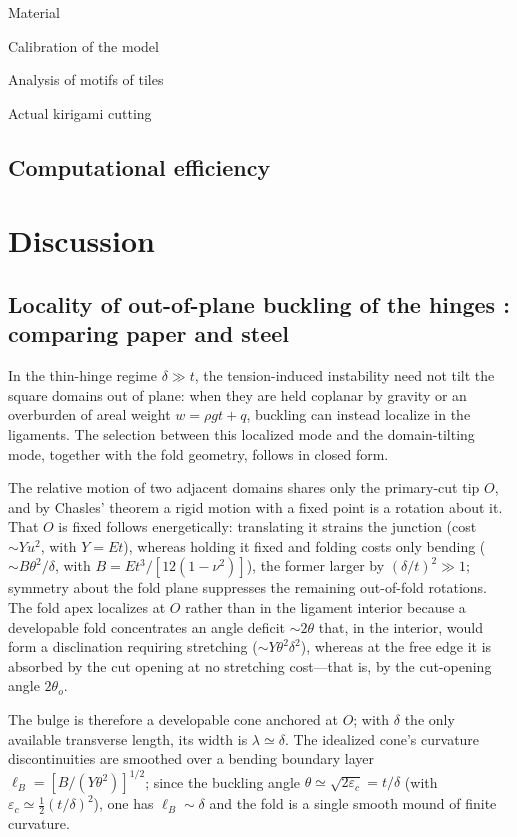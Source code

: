 \documentclass[pdflatex,sn-mathphys-num]{sn-jnl}%
\theoremstyle{thmstyleone}%
\theoremstyle{thmstyletwo}%
\theoremstyle{thmstylethree}%
\begin{document}
Material

Calibration of the model

Analysis of motifs of tiles

Actual kirigami cutting


\subsection{Computational efficiency}


\section{Discussion}\label{secD}

\subsection{Locality of out-of-plane buckling of the hinges : comparing paper and steel}

In the thin-hinge regime $\delta\gg t$, the tension-induced instability need not
tilt the square domains out of plane: when they are held coplanar by gravity or an
overburden of areal weight $w=\rho g t+q$, buckling can instead localize in the
ligaments. The selection between this localized mode and the domain-tilting mode,
together with the fold geometry, follows in closed form.

The relative motion of two adjacent domains shares only the primary-cut tip $O$, and
by Chasles' theorem a rigid motion with a fixed point is a rotation about it. That $O$
is fixed follows energetically: translating it strains the junction (cost $\sim Yu^2$,
with $Y=Et$), whereas holding it fixed and folding costs only bending
($\sim B\theta^2/\delta$, with $B=Et^3/[12(1-\nu^2)]$), the former larger by
$(\delta/t)^2\gg1$; symmetry about the fold plane suppresses the remaining out-of-fold
rotations. The fold apex localizes at $O$ rather than in the ligament interior because
a developable fold concentrates an angle deficit $\sim 2\theta$ that, in the interior,
would form a disclination requiring stretching ($\sim Y\theta^2\delta^2$), whereas at
the free edge it is absorbed by the cut opening at no stretching cost---that is, by the
cut-opening angle $2\theta_o$.

The bulge is therefore a developable cone anchored at $O$; with $\delta$ the only
available transverse length, its width is $\lambda\simeq\delta$. The idealized cone's
curvature discontinuities are smoothed over a bending boundary layer
$\ell_B=[B/(Y\theta^2)]^{1/2}$; since the buckling angle
$\theta\simeq\sqrt{2\varepsilon_c}=t/\delta$ (with $\varepsilon_c\simeq\tfrac12(t/\delta)^2$),
one has $\ell_B\sim\delta$ and the fold is a single smooth mound of finite curvature.
\end{document}
